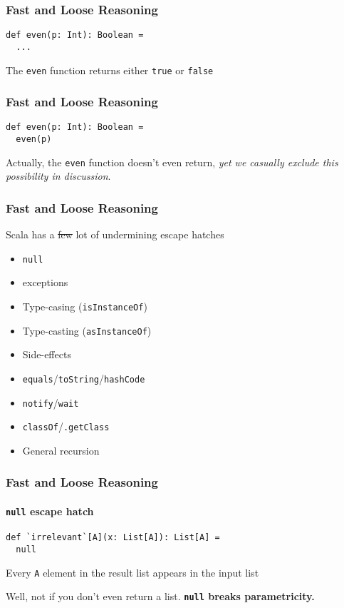\begin{frame}[fragile]
\frametitle{Fast and Loose Reasoning}
\begin{lstlisting}[style=scala]
def even(p: Int): Boolean = 
  ...
\end{lstlisting}
\begin{theorem}The \lstinline{even} function returns either \lstinline{true} or \lstinline{false}\end{theorem}
\end{frame}

\begin{frame}[fragile]
\frametitle{Fast and Loose Reasoning}
\begin{lstlisting}[style=scala]
def even(p: Int): Boolean = 
  even(p)
\end{lstlisting}
Actually, the \lstinline{even} function doesn't even return, \emph{yet we
casually exclude this possibility in discussion}.
\end{frame}

\begin{frame}[fragile]
\frametitle{Fast and Loose Reasoning}
\begin{block}{Scala has a \sout{few} lot of undermining escape hatches}
\begin{itemize}
  \item \lstinline{null}
  \item exceptions
  \item Type-casing (\lstinline{isInstanceOf})
  \item Type-casting (\lstinline{asInstanceOf})
  \item Side-effects
  \item \lstinline{equals}/\lstinline{toString}/\lstinline{hashCode}
  \item \lstinline{notify}/\lstinline{wait}
  \item \lstinline{classOf}/\lstinline{.getClass}
  \item General recursion
\end{itemize}
\end{block}
\end{frame}

\begin{frame}[fragile]
\frametitle{Fast and Loose Reasoning}
\framesubtitle{\lstinline{null} escape hatch}
\begin{lstlisting}[style=scala]
def `irrelevant`[A](x: List[A]): List[A] = 
  null
\end{lstlisting}
\begin{theorem}Every \lstinline{A} element in the result list appears in the input list\end{theorem}
Well, not if you don't even return a list.
\textbf{\lstinline$null$ breaks parametricity.}
\end{frame}

